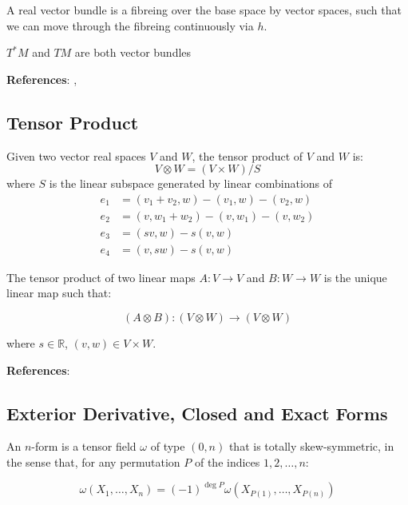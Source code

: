 \begin{remark}
A real vector bundle is a fibreing over the base space by vector spaces, such that we can move through the fibreing continuously via $h$.  
\end{remark}

\begin{remark}
$T^{*} M$ and $TM$ are both vector bundles
\end{remark}

\noindent \textbf{References}: \textcite{Terek2020}, \textcite{Bjorn2018}

\subsection{Tensor Product}
Given two vector real spaces $V$ and $W$, the tensor product of $V$ and $W$ is:
$$V \otimes W = (V \times W)/S$$
\noindent where $S$ is the linear subspace generated by linear combinations of
\begin{align}
e_{1} &= (v_{1} + v_{2}, w) - (v_{1}, w) - (v_{2}, w) \\ 
e_{2} &= (v, w_{1} + w_{2})  - (v, w_{1}) - (v, w_{2}) \\ 
e_{3} &= (sv, w) - s(v, w) \\
e_{4} &= (v, sw) - s(v, w)
\end{align}

\begin{defn}
The tensor product of two linear maps $A: V \to V$ and $B: W \to W$ is the unique linear map such that:

$$(A \otimes B): (V \otimes W) \to (V \otimes W)$$

\noindent where $s \in \mathbb{R}$, $(v,w) \in V \times W$. 
\end{defn}

\noindent \textbf{References}: \textcite{Isham:1999rh}

\subsection{Exterior Derivative, Closed and Exact Forms}

\begin{defn}
\noindent An $n$-form is a tensor field $\omega$ of type $(0, n)$ that is totally skew-symmetric, in the sense that, for any permutation $P$ of the indices $1, 2, \dots, n$:

\[
\omega(X_{1}, \dots, X_{n}) = (-1)^{\deg P} \omega(X_{P(1)}, \dots, X_{P(n)})
\]
\end{defn}

